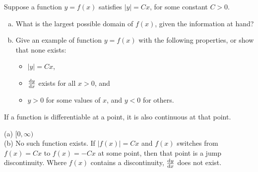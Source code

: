 \begin{question}
Suppose a function $y=f(x)$ satisfies $|y| = Cx$, for some constant $C>0$.
\begin{enumerate}[(a)]
\item What is the largest possible domain of $f(x)$, given the information at hand?
\item Give an example of function $y=f(x)$  with the following properties, or show that none exists:
\begin{itemize}
\item $|y| = Cx$,
\item $\diff{y}{x}$ exists for all $x>0$, and
\item $y>0$ for some values of $x$, and $y<0$ for others.
\end{itemize}
\end{enumerate}
\end{question}
\begin{hint}
If a function is differentiable at a point, it is also continuous at that point.
\end{hint}
\begin{answer}
(a) $[0,\infty)$\\
(b) No such function exists. If $|f(x)|=Cx$ and $f(x)$ switches from $f(x)=Cx$ to $f(x)=-Cx$ at some point, then that point is a jump discontinuity. Where $f(x)$ contains a discontinuity, $\diff{y}{x}$ does not exist.
\end{answer}
